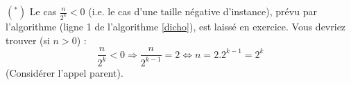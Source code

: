 $(^*)$
Le cas $\frac{n}{2^k}<0$ 
(i.e. le cas d'une taille négative d'instance),
 prévu par l'algorithme
(ligne 1 de l'algorithme \ref{dicho}),
 est laissé en exercice.
Vous devriez trouver (si $n>0$) :
$$
\frac{n}{2^k}<0 \Rightarrow
 \frac{n}{2^{k-1}}=2
	\iff n = 2.2^{k-1} = 2^k
$$
(Considérer l'appel parent).